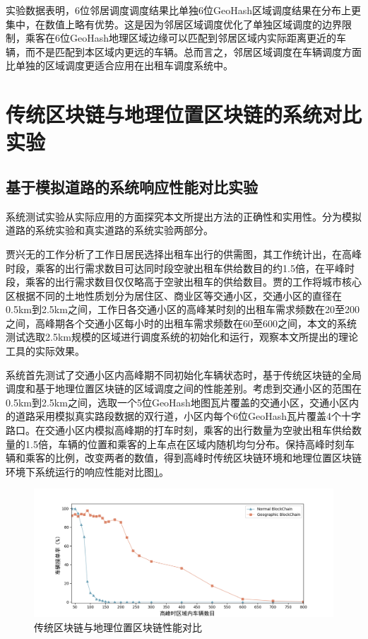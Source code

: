 实验数据表明，6位邻居调度调度结果比单独6位GeoHash区域调度结果在分布上更集中，在数值上略有优势。这是因为邻居区域调度优化了单独区域调度的边界限制，乘客在6位GeoHash地理区域边缘可以匹配到邻居区域内实际距离更近的车辆，而不是匹配到本区域内更远的车辆。总而言之，邻居区域调度在车辆调度方面比单独的区域调度更适合应用在出租车调度系统中。

\section{传统区块链与地理位置区块链的系统对比实验}
\subsection{基于模拟道路的系统响应性能对比实验}
系统测试实验从实际应用的方面探究本文所提出方法的正确性和实用性。分为模拟道路的系统实验和真实道路的系统实验两部分。

贾兴无的工作分析了工作日居民选择出租车出行的供需图，其工作统计出，在高峰时段，乘客的出行需求数目可达同时段空驶出租车供给数目的约1.5倍，在平峰时段，乘客的出行需求数目仅仅略高于空驶出租车的供给数目。贾的工作将城市核心区根据不同的土地性质划分为居住区、商业区等交通小区，交通小区的直径在0.5km到2.5km之间，工作日各交通小区的高峰某时刻的出租车需求频数在20至200之间，高峰期各个交通小区每小时的出租车需求频数在60至600之间，本文的系统测试选取2.5km规模的区域进行调度系统的初始化和运行，观察本文所提出的理论工具的实际效果。

系统首先测试了交通小区内高峰期不同初始化车辆状态时，基于传统区块链的全局调度和基于地理位置区块链的区域调度之间的性能差别。考虑到交通小区的范围在0.5km到2.5km之间，选取一个5位GeoHash地图瓦片覆盖的交通小区，交通小区内的道路采用模拟真实路段数据的双行道，小区内每个6位GeoHash瓦片覆盖4个十字路口。在交通小区内模拟高峰期的打车时刻，乘客的出行数量为空驶出租车供给数量的1.5倍，车辆的位置和乘客的上车点在区域内随机均匀分布。保持高峰时刻车辆和乘客的比例，改变两者的数值，得到高峰时传统区块链环境和地理位置区块链环境下系统运行的响应性能对比图\ref{fig:compare}。

\begin{figure}[h]
  \centering
  \includegraphics[width=1.0\textwidth]{figures/性能对比}
  \caption{传统区块链与地理位置区块链性能对比}\label{fig:compare}
\end{figure}

